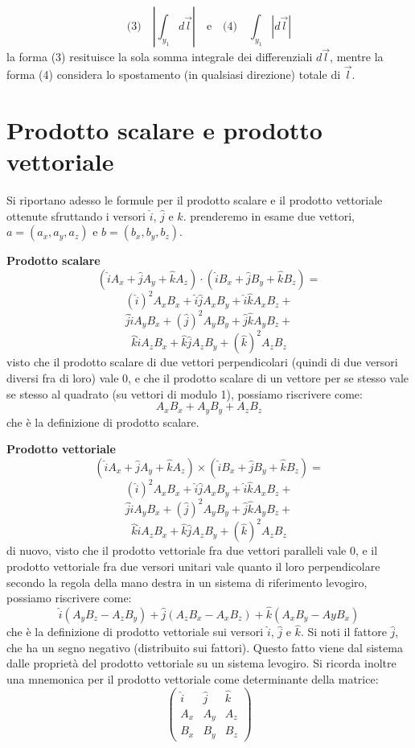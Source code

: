 \documentclass[a4paper,12pt]{article}
\begin{document}
$$ \textrm{(3)} \quad |\int_{y_1} d\vec{l} | \quad \textrm{e} \quad \textrm{(4)} \quad \int_{y_1} | d\vec{l} | $$
la forma (3) resituisce la sola somma integrale dei differenziali $d\vec{l}$, mentre la forma (4) considera lo
spostamento (in qualsiasi direzione) totale di $\vec{l}$.

\section{Prodotto scalare e prodotto vettoriale}

Si riportano adesso le formule per il prodotto scalare e il prodotto vettoriale ottenute sfruttando i versori 
$\hat{i}$, $\hat{j}$ e $\hat{k}$. prenderemo in esame due vettori, $a = (a_x, a_y, a_z)$ e $b = (b_x, b_y, b_z)$.
\par\medskip
\textbf{Prodotto scalare} \\
$$ (\hat{i}A_x + \hat{j}A_y + \hat{k}A_z) \cdot (\hat{i}B_x + \hat{j}B_y + \hat{k}B_z) = $$ $$
(\hat{i})^2A_xB_x + \hat{i}\hat{j}A_xB_y + \hat{i}\hat{k}A_xB_z + $$ $$
\hat{j}\hat{i}A_yB_x + (\hat{j})^2A_yB_y + \hat{j}\hat{k}A_yB_z + $$ $$
\hat{k}\hat{i}A_zB_x + \hat{k}\hat{j}A_zB_y + (\hat{k})^2A_zB_z $$
visto che il prodotto scalare di due vettori perpendicolari (quindi di due versori diversi fra di loro) vale 0,
e che il prodotto scalare di un vettore per se stesso vale se stesso al quadrato (su vettori di modulo 1), possiamo
riscrivere come:
$$
A_xB_x+A_yB_y+A_zB_z
$$
che è la definizione di prodotto scalare.

\par\medskip
\textbf{Prodotto vettoriale} \\
$$ (\hat{i}A_x + \hat{j}A_y + \hat{k}A_z) \times (\hat{i}B_x + \hat{j}B_y + \hat{k}B_z) = $$ $$
(\hat{i})^2A_xB_x + \hat{i}\hat{j}A_xB_y + \hat{i}\hat{k}A_xB_z + $$ $$
\hat{j}\hat{i}A_yB_x + (\hat{j})^2A_yB_y + \hat{j}\hat{k}A_yB_z + $$ $$
\hat{k}\hat{i}A_zB_x + \hat{k}\hat{j}A_zB_y + (\hat{k})^2A_zB_z $$
di nuovo, visto che il prodotto vettoriale fra due vettori paralleli vale 0, e il prodotto vettoriale fra due
versori unitari vale quanto il loro perpendicolare secondo la regola della mano destra in un sistema di riferimento
levogiro, possiamo riscrivere come:
$$
\hat{i}(A_yB_z - A_zB_y) + \hat{j}(A_zB_x - A_xB_z) + \hat{k}(A_xB_y - AyB_x)
$$
che è la definizione di prodotto vettoriale sui versori $\hat{i}$, $\hat{j}$ e $\hat{k}$. Si noti il fattore $\hat{j}$,
che ha un segno negativo (distribuito sui fattori). Questo fatto viene dal sistema dalle proprietà del prodotto
vettoriale su un sistema levogiro. Si ricorda inoltre una mnemonica per il prodotto vettoriale come determinante della matrice:
\[
\begin{pmatrix}
  \hat{i} & \hat{j} & \hat{k} \\
    A_x & A_y & A_z \\
    B_x & B_y & B_z
  \end{pmatrix}
  \]
\end{document}
